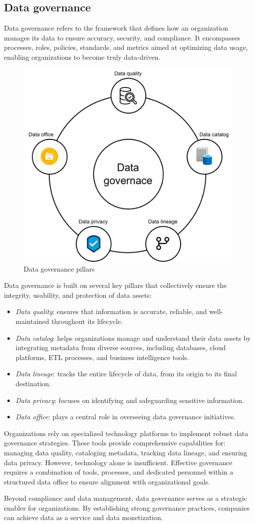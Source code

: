 \subsection{Data governance}
Data governance refers to the framework that defines how an organization manages its data to ensure accuracy, security, and compliance. 
It encompasses processes, roles, policies, standards, and metrics aimed at optimizing data usage, enabling organizations to become truly data-driven.
\begin{figure}[H]
    \centering
    \includegraphics[width=0.5\linewidth]{images/bis12.png}
    \caption{Data governance pillars}
\end{figure}
Data governance is built on several key pillars that collectively ensure the integrity, usability, and protection of data assets:
\begin{itemize}
    \item \textit{Data quality}: ensures that information is accurate, reliable, and well-maintained throughout its lifecycle.
    \item \textit{Data catalog}: helps organizations manage and understand their data assets by integrating metadata from diverse sources, including databases, cloud platforms, ETL processes, and business intelligence tools.
    \item \textit{Data lineage}: tracks the entire lifecycle of data, from its origin to its final destination.
    \item \textit{Data privacy}: focuses on identifying and safeguarding sensitive information. 
    \item \textit{Data office}: plays a central role in overseeing data governance initiatives.
\end{itemize}
\noindent Organizations rely on specialized technology platforms to implement robust data governance strategies. 
These tools provide comprehensive capabilities for: managing data quality, cataloging metadata, tracking data lineage, and ensuring data privacy. 
However, technology alone is insufficient. 
Effective governance requires a combination of tools, processes, and dedicated personnel within a structured data office to ensure alignment with organizational goals.

Beyond compliance and data management, data governance serves as a strategic enabler for organizations. 
By establishing strong governance practices, companies can achieve data as a service and data monetization.